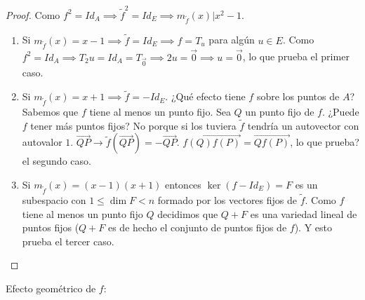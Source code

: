 \documentclass[14pt]{book}
\begin{document}
\begin{proof}
	Como $f^2 = Id_A \implies \tilde{f}^2 = Id_E \implies m_{\tilde{f}}(x) \vert x^2 - 1$.
	\begin{enumerate}
		\item Si $m_{\tilde{f}}(x) = x - 1 \implies \tilde{f} = Id_E \implies f = T_u$ para algún $u \in E$. Como $f^2 = Id_A \implies T_2u = Id_A = T_{\vec{0}} \implies 2u = \vec{0} \implies u = \vec{0}$, lo que prueba el primer caso.
		
		\item Si $m_{\tilde{f}}(x) = x + 1 \implies \tilde{f} = - Id_E$. ¿Qué efecto tiene $f$ sobre los puntos de $A$? Sabemos que $f$ tiene al menos un punto fijo. Sea $Q$ un punto fijo de $f$. ¿Puede $f$ tener más puntos fijos? No porque si los tuviera $\tilde{f}$ tendría un autovector con autovalor $1$. $\overrightarrow{QP} \to \tilde{f}(\overrightarrow{QP}) = - \overrightarrow{QP}$. $\overrightarrow{f(Q)f(P)} = \overrightarrow{Qf(P)}$, lo que prueba? el segundo caso.
		
		\item Si $m_{\tilde{f}}(x) = (x - 1)(x + 1)$ entonces $\ker (f - Id_E) = F$ es un subespacio con $1 \leq \dim F < n$ formado por los vectores fijos de $\tilde{f}$. Como $f$ tiene al menos un punto fijo $Q$ decidimos que $Q + F$ es una variedad lineal de puntos fijos ($Q + F$ es de hecho el conjunto de puntos fijos de $f$). Y esto prueba el tercer caso.
	\end{enumerate}
\end{proof}

Efecto geométrico de $f$:
\end{document}
